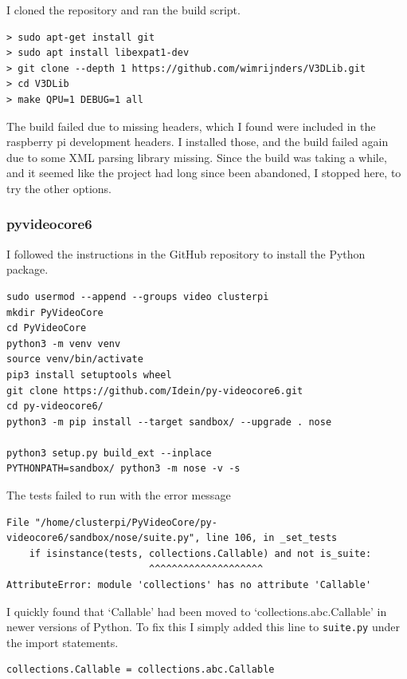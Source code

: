 \documentclass[12pt]{article}
\begin{document}
I cloned the repository and ran the build script.
	
\begin{lstlisting}
> sudo apt-get install git                                     
> sudo apt install libexpat1-dev                                
> git clone --depth 1 https://github.com/wimrijnders/V3DLib.git  
> cd V3DLib
> make QPU=1 DEBUG=1 all                                
\end{lstlisting}

The build failed due to missing headers, which I found were included in the raspberry pi development headers. I installed those, and the build failed again due to some XML parsing library missing. Since the build was taking a while, and it seemed like the project had long since been abandoned, I stopped here, to try the other options.

\subsubsection{pyvideocore6}

I followed the instructions in the GitHub repository to install the Python package.

\begin{lstlisting}
sudo usermod --append --groups video clusterpi
mkdir PyVideoCore
cd PyVideoCore
python3 -m venv venv
source venv/bin/activate
pip3 install setuptools wheel
git clone https://github.com/Idein/py-videocore6.git
cd py-videocore6/
python3 -m pip install --target sandbox/ --upgrade . nose

python3 setup.py build_ext --inplace
PYTHONPATH=sandbox/ python3 -m nose -v -s
\end{lstlisting}

The tests failed to run with the error message

\begin{lstlisting}
File "/home/clusterpi/PyVideoCore/py-videocore6/sandbox/nose/suite.py", line 106, in _set_tests
    if isinstance(tests, collections.Callable) and not is_suite:
                         ^^^^^^^^^^^^^^^^^^^^
AttributeError: module 'collections' has no attribute 'Callable'
\end{lstlisting}

I quickly found that `Callable' had been moved to `collections.abc.Callable' in newer versions of Python. To fix this I simply added this line to \verb|suite.py| under the import statements.

\begin{lstlisting}
collections.Callable = collections.abc.Callable
\end{lstlisting}
\end{document}
